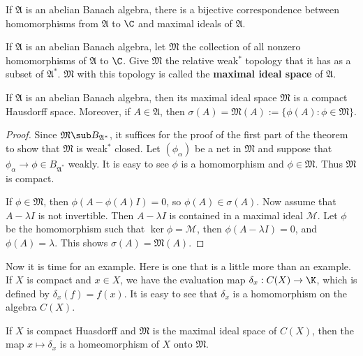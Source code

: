 \begin{corollary}
If $\mathfrak{A}$ is an abelian Banach algebra, there is a bijective correspondence between homomorphisms from $\mathfrak{A}$ to $\C$ and maximal ideals of $\mathfrak{A}$.
\end{corollary}
\begin{definition}
If $\mathfrak{A}$ is an abelian Banach algebra, let $\mathfrak{M}$ the collection of all nonzero homomorphisms of $\mathfrak{A}$ to $\C$. Give $\mathfrak{M}$ the relative weak$^*$ topology that it has as a subset of $\mathfrak{A}^*$. $\mathfrak{M}$ with this topology is called the \textbf{maximal ideal space} of $\mathfrak{A}$.
\end{definition}
\begin{theorem}\label{Banach algebran abelian maximal space prop}
If $\mathfrak{A}$ is an abelian Banach algebra, then its maximal ideal space $\mathfrak{M}$ is a compact Hausdorff space. Moreover, if $A\in\mathfrak{A}$, then $\sigma(A)=\mathfrak{M}(A):=\{\phi(A):\phi\in\mathfrak{M}\}$.
\end{theorem}
\begin{proof}
Since $\mathfrak{M}\sub B_{\mathfrak{A}^*}$, it suffices for the proof of the first part of the theorem to show that $\mathfrak{M}$ is weak$^*$ closed. Let $(\phi_\alpha)$ be a net in $\mathfrak{M}$ and suppose that $\phi_\alpha\to\phi\in B_{\mathfrak{A}^*}$ weakly. It is easy to see  $\phi$ is a homomorphism and $\phi\in\mathfrak{M}$. Thus $\mathfrak{M}$ is compact.\par
If $\phi\in\mathfrak{M}$, then $\phi(A-\phi(A)I)=0$, so $\phi(A)\in\sigma(A)$. Now assume that $A-\lambda I$ is not invertible. Then $A-\lambda I$ is contained in a maximal ideal $\mathscr{M}$. Let $\phi$ be the homomorphism such that $\ker\phi=\mathscr{M}$, then $\phi(A-\lambda I)=0$, and $\phi(A)=\lambda$. This shows $\sigma(A)=\mathfrak{M}(A)$.
\end{proof}
Now it is time for an example. Here is one that is a little more than an example. If $X$ is compact and $x\in X$, we have the evaluation map $\delta_x:C(X)\to\K$, which is defined by $\delta_x(f)=f(x)$. It is easy to see that $\delta_x$ is a homomorphism on the algebra $C(X)$.
\begin{proposition}\label{maximal space of C(X) homeomorphic to X}
If $X$ is compact Huasdorff and $\mathfrak{M}$ is the maximal ideal space of $C(X)$, then the map $x\mapsto\delta_x$ is a homeomorphism of $X$ onto $\mathfrak{M}$.
\end{proposition}
